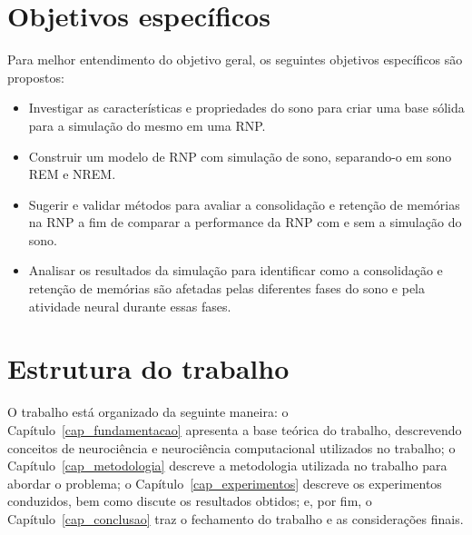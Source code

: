 \section{Objetivos específicos}

Para melhor entendimento do objetivo geral, os seguintes objetivos específicos são propostos:

\begin{itemize}

  \item Investigar as características e propriedades do sono para criar uma base sólida para a simulação do mesmo em uma RNP.\@

  \item Construir um modelo de RNP com simulação de sono, separando-o em sono REM e NREM.\@

  \item Sugerir e validar métodos para avaliar a consolidação e retenção de memórias na RNP a fim de comparar a performance da
  RNP com e sem a simulação do sono.

  \item  Analisar os resultados da simulação para identificar como a consolidação e retenção de memórias são afetadas pelas
diferentes fases do sono e pela atividade neural durante essas fases.

\end{itemize}

\section{Estrutura do trabalho}

O trabalho está organizado da seguinte maneira: o Capítulo~\ref{cap_fundamentacao} apresenta a base teórica do trabalho,
descrevendo conceitos de neurociência e neurociência computacional utilizados no trabalho; o Capítulo~\ref{cap_metodologia}
descreve a metodologia utilizada no trabalho para abordar o problema; o Capítulo~\ref{cap_experimentos} descreve os experimentos
conduzidos, bem como discute os resultados obtidos; e, por fim, o Capítulo~\ref{cap_conclusao} traz o fechamento do trabalho e as
considerações finais.
